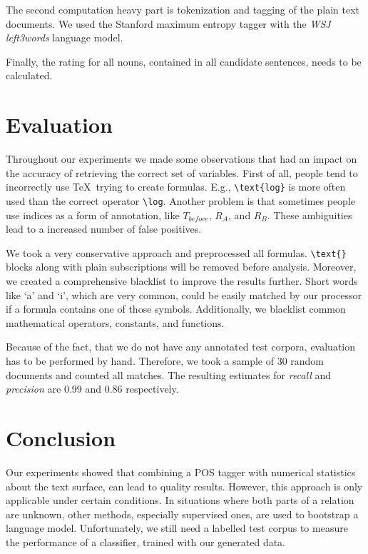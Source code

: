\documentclass[runningheads]{llncs}
\begin{document}
The second computation heavy part is tokenization and tagging of the plain
text documents. We used the Stanford maximum entropy tagger with the \emph{WSJ
left3words} language model.

Finally, the rating for all nouns, contained in all candidate sentences, needs
to be calculated.


\section{Evaluation}
\label{vr}
Throughout our experiments we made some observations that had an impact on the
accuracy of retrieving the correct set of variables. First of all, people tend
to incorrectly use \TeX\ trying to create formulas. E.g.,
\texttt{\textbackslash text\{log\}} is more often used than the correct
operator \texttt{\textbackslash log}. Another problem is that sometimes people
use indices as a form of annotation, like $T_{before}$, $R_{A}$, and $R_{B}$.
These ambiguities lead to a increased number of false positives.

We took a very conservative approach and preprocessed all formulas.
\texttt{\textbackslash text\{\}} blocks along with plain subscriptions will be
removed before analysis. Moreover, we created a comprehensive blacklist to
improve the results further. Short words like `a' and `i', which are very
common, could be easily matched by our processor if a formula contains one of
those symbols. Additionally, we blacklist common mathematical operators,
constants, and functions.

Because of the fact, that we do not have any annotated test corpora,
evaluation has to be performed by hand. Therefore, we took a sample of 30
random documents and counted all matches. The resulting estimates for
\emph{recall} and \emph{precision} are 0.99 and 0.86 respectively.




\section{Conclusion}
Our experiments showed that combining a POS tagger with numerical statistics
about the text surface, can lead to quality results. However, this approach is
only applicable under certain conditions. In situations where both parts of a
relation are unknown, other methods, especially supervised ones, are used to
bootstrap a language model. Unfortunately, we still need a labelled test
corpus to measure the performance of a classifier, trained with our generated
data.
\end{document}
